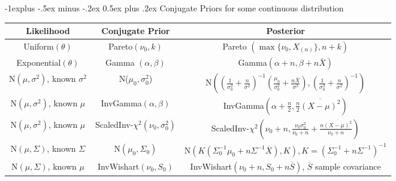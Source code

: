\documentclass[10pt,landscape]{article}
\makeatletter
\renewcommand{\subsection}{\@startsection{subsection}{2}{0mm}%
                                {-1explus -.5ex minus -.2ex}%
                                {0.5ex plus .2ex}%
                                {\normalfont\normalsize\bfseries}}
\makeatother
\begin{document}
\subsection{Conjugate Priors for some continuous distribution}
\begin{center}
    \renewcommand{\arraystretch}{3.7}
\begin{tabular}{ccc}
    \textbf{Likelihood} & \textbf{Conjugate Prior} & \textbf{Posterior} \\\hline

    Uniform$(\theta)$ & Pareto$(\nu_0,k)$ & Pareto $\left(\max\{\nu_0,X_{(n)}\}, n+k \right)$\\\hline

    Exponential$(\theta)$ & Gamma $(\alpha,\beta)$ & Gamma$(\alpha+n,\beta+n\bar{X})$\\\hline

    N$(\mu,\sigma^2)$, known $\sigma^2$ & N($\mu_0,\sigma_0^2$) & N$\left(\left( \frac{1}{\sigma_0^2} + \frac{n}{\sigma^2}\right)^{-1} \left( \frac{\mu_0}{\sigma_0^2} + \frac{n\bar{X}}{\sigma^2}\right), \left(\frac{1}{\sigma_0^2} + \frac{n}{\sigma^2}\right)^{-1}\right)$ \\\hline

    N$(\mu,\sigma^2)$, known $\mu$ & InvGamma$(\alpha,\beta)$ & InvGamma$\left(\alpha+\frac{n}{2}, \frac{n}{2} \overline{(X-\mu)^2}\right)$ \\\hline

    N$(\mu,\sigma^2)$, known $\mu$ & ScaledInv-$\chi^2(\nu_0,\sigma_0^2)$ & ScaledInv-$\chi^2 \left(\nu_0+n, \frac{\nu_0\sigma_0^2}{\nu_0+n} + \frac{n\overline{(X-\mu)^2}}{\nu_0+n}\right)$ \\\hline
    
    N$(\mu,\Sigma)$, known $\Sigma$ & N$(\mu_0,\Sigma_0)$ & N$\left(K (\Sigma_0^{-1}\mu_0+n\Sigma^{-1}\overline{X}), K\right), K=(\Sigma_0^{-1}+n\Sigma^{-1})^{-1}$ \\\hline

     N$(\mu,\Sigma)$, known $\mu$ & InvWishart$(\nu_0,S_0)$ & InvWishart$(\nu_0 +n, S_0+n\overline{S})$, $\overline{S}$ sample covariance \\\hline\hline
    

\end{tabular}
\end{center}
\end{document}
